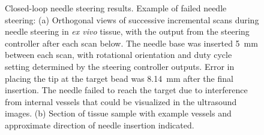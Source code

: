 \begin{figure}[!t]
\centerline{
\hfil
{}}
\caption[Closed-loop needle steering results; failed steering trial]{Closed-loop needle steering results. Example of failed needle steering: (a) Orthogonal views of successive incremental scans during needle steering in \textit{ex vivo} tissue, with the output from the steering controller after each scan below. The needle base was inserted 5~mm between each scan, with rotational orientation and duty cycle setting determined by the steering controller outputs. Error in placing the tip at the target bead was 8.14~mm after the final insertion. The needle failed to reach the target due to interference from internal vessels that could  be visualized in the ultrasound images. (b) Section of tissue sample with example vessels and approximate direction of needle insertion indicated.}
\label{fig:FailedSteering}
\end{figure}


